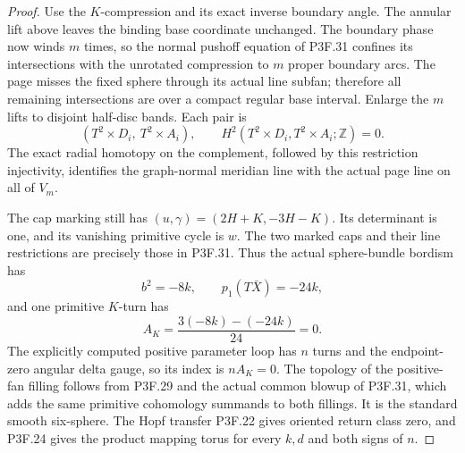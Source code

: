 \begin{proof}
Use the \(K\)-compression and its exact inverse boundary angle. The annular lift above leaves the binding base coordinate unchanged. The boundary phase now winds \(m\) times, so the normal pushoff equation of P3F.31 confines its intersections with the unrotated compression to \(m\) proper boundary arcs. The page misses the fixed sphere through its actual line subfan; therefore all remaining intersections are over a compact regular base interval. Enlarge the \(m\) lifts to disjoint half-disc bands. Each pair is \[
 (T^2\times D_i,\ T^2\times A_i),
 \qquad H^2(T^2\times D_i,T^2\times A_i;\mathbb Z)=0.
\] The exact radial homotopy on the complement, followed by this restriction injectivity, identifies the graph-normal meridian line with the actual page line on all of \(V_m\).

The cap marking still has \((u,\gamma)=(2H+K,-3H-K)\). Its determinant is one, and its vanishing primitive cycle is \(w\). The two marked caps and their line restrictions are precisely those in P3F.31. Thus the actual sphere-bundle bordism has \[
 b^2=-8k,\qquad p_1(T\bar X)=-24k,
\] and one primitive \(K\)-turn has \[
 A_K=\frac{3(-8k)-(-24k)}{24}=0.
\] The explicitly computed positive parameter loop has \(n\) turns and the endpoint-zero angular delta gauge, so its index is \(nA_K=0\). The topology of the positive-fan filling follows from P3F.29 and the actual common blowup of P3F.31, which adds the same primitive cohomology summands to both fillings. It is the standard smooth six-sphere. The Hopf transfer P3F.22 gives oriented return class zero, and P3F.24 gives the product mapping torus for every \(k,d\) and both signs of \(n\).
\end{proof}
